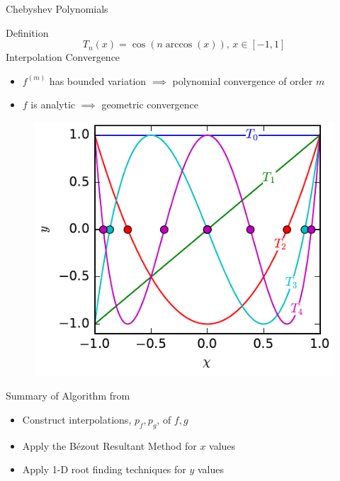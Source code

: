 \documentclass[final]{beamer}
\begin{document}
\begin{frame}{}
\begin{columns}[t]
\begin{column}{.31\linewidth}
\begin{block}{Chebyshev Polynomials}
\begin{minipage}{.5725\linewidth}
{\color{numhypRed} Definition}
$$T_n(x)=\cos\left(n\arccos(x)\right),\, x\in[-1,1]$$
{\color{numhypRed} Interpolation Convergence \cite[Ch.\ 7, 8]{trefethen_2012}}
\begin{itemize}
\item $f^{(m)}$ has bounded variation $\implies$ polynomial convergence of order $m$
\item $f$ is analytic $\implies$ geometric convergence 
\end{itemize}
\end{minipage}%
\hfill%
\begin{minipage}{.3775\linewidth}
\begin{center}
\begin{figure}
\includegraphics[width=\textwidth]{cheb_poly_plot.pdf}
\end{figure}
\end{center}
\end{minipage}%
\end{block}
\begin{block}{Summary of Algorithm from \cite{nakatsukasa_2013}}
\begin{itemize}
\item Construct interpolations, $p_f,p_g$, of $f,g$ \cite[Sec.\ 2]{townsend_2013}
\item Apply the B\'{e}zout Resultant Method for $x$ values
\item Apply 1-D root finding techniques for $y$ values

\end{itemize}
\end{block}
\end{column}
\end{columns}
\end{frame}
\end{document}

